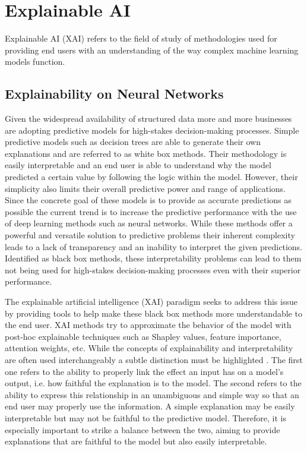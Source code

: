 \section{Explainable AI}
\label{sec:rw_xai}
    Explainable AI (XAI) refers to the field of study of methodologies used for providing end users with an understanding of the way complex machine learning models function.
    
     \subsection{Explainability on Neural Networks}
     \label{sec:rw_exp_on_gnn}
        Given the widespread availability of structured data more and more businesses are adopting predictive models for high-stakes decision-making processes. Simple predictive models such as decision trees are able to generate their own explanations and are referred to as white box methods. Their methodology is easily interpretable and an end user is able to understand why the model predicted a certain value by following the logic within the model. However, their simplicity also limits their overall predictive power and range of applications. 
        Since the concrete goal of these models is to provide as accurate predictions as possible the current trend is to increase the predictive performance with the use of deep learning methods such as neural networks. While these methods offer a powerful and versatile solution to predictive problems their inherent complexity leads to a lack of transparency and an inability to interpret the given predictions. Identified as black box methods, these interpretability problems can lead to them not being used for high-stakes decision-making processes even with their superior performance. 
        
        The explainable artificial intelligence (XAI) paradigm seeks to address this issue by providing tools to help make these black box methods more understandable to the end user. XAI methods try to approximate the behavior of the model
        with post-hoc explainable techniques such as Shapley values, feature importance, attention weights, etc. 
        While the concepts of explainability and interpretability are often used interchangeably a subtle distinction must be highlighted \cite{stevens2022}. The first one refers to the ability to properly link the effect an input has on a model's output, i.e. how faithful the explanation is to the model. The second refers to the ability to express this relationship in an unambiguous and simple way so that an end user may properly use the information. A simple explanation may be easily interpretable but may not be faithful to the predictive model. Therefore, it is especially important to strike a balance between the two, aiming to provide explanations that are faithful to the model but also easily interpretable.
        
